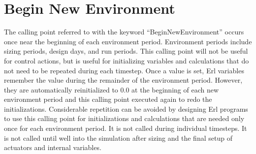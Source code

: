 \section{Begin New Environment}\label{begin-new-environment}

The calling point referred to with the keyword ``BeginNewEnvironment'' occurs once near the beginning of each environment period. Environment periods include sizing periods, design days, and run periods. This calling point will not be useful for control actions, but is useful for initializing variables and calculations that do not need to be repeated during each timestep. Once a value is set, Erl variables remember the value during the remainder of the environment period. However, they are automatically reinitialized to 0.0 at the beginning of each new environment period and this calling point executed again to redo the initializations. Considerable repetition can be avoided by designing Erl programs to use this calling point for initializations and calculations that are needed only once for each environment period. It is not called during individual timesteps. It is not called until well into the simulation after sizing and the final setup of actuators and internal variables. 
